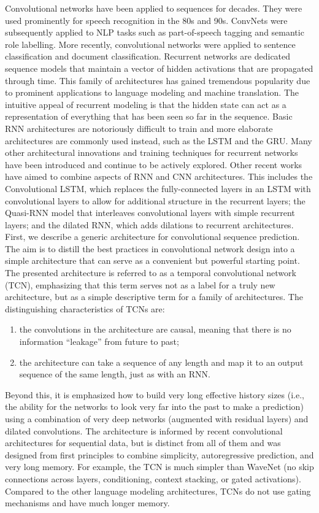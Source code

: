 \documentclass[12pt,a4paper,titlepage,openany]{report}
\begin{document}
Convolutional networks have been applied to sequences for decades. They were used prominently for speech recognition in the 80s and 90s. 
ConvNets were subsequently applied to NLP tasks such as part-of-speech tagging and semantic role labelling. 
More recently, convolutional networks were applied to sentence classification and document classification. 
Recurrent networks are dedicated sequence models that maintain a vector of hidden activations that are propagated through time. 
This family of architectures has gained tremendous popularity due to prominent applications to language modeling and machine translation. 
The intuitive appeal of recurrent modeling is that the hidden state can act as a representation of everything that has been seen so far in the sequence. 
Basic RNN architectures are notoriously difficult to train and more elaborate architectures are commonly used instead, such as the LSTM and the GRU. 
Many other architectural innovations and training techniques for recurrent networks have been introduced and continue to be actively explored.
Other recent works have aimed to combine aspects of RNN and CNN architectures. This includes the Convolutional LSTM, which replaces the fully-connected layers in an LSTM with convolutional layers to allow for additional structure in the recurrent layers; the Quasi-RNN model that interleaves convolutional layers with simple recurrent layers; and the dilated RNN, which adds dilations to recurrent architectures.\\

First, we describe a generic architecture for convolutional sequence prediction. 
The aim is to distill the best practices in convolutional network design into a simple architecture that can serve as a convenient but powerful starting point. 
The presented architecture is referred to as a temporal convolutional network (TCN), emphasizing that this term serves not as a label for a truly new architecture, but as a simple descriptive term for a family of architectures. 
The distinguishing characteristics of TCNs are: 
\begin{enumerate}
     \item the convolutions in the architecture are causal, meaning that there is no information “leakage” from future to past; 
     \item the architecture can take a sequence of any length and map it to an output sequence of the same length, just as with an RNN. 
\end{enumerate}   
Beyond this, it is emphasized how to build very long effective history sizes (i.e., the ability for the networks to look very far into the past to make a prediction) using a combination of very deep networks (augmented with residual layers) and dilated convolutions. The architecture is informed by recent convolutional architectures for sequential data, but is distinct from all of them and was designed from first principles to combine simplicity, autoregressive prediction, and very long memory. For example, the TCN is much simpler than WaveNet (no skip connections across layers, conditioning, context stacking, or gated activations). 
Compared to the other language modeling architectures, TCNs do not use gating mechanisms and have much longer memory.\cite{bai2018}
\end{document}
